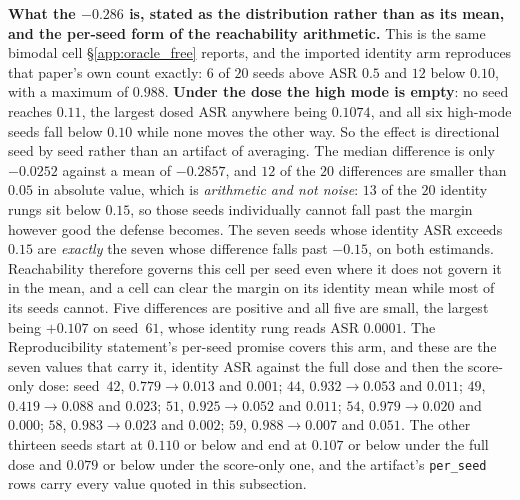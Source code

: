 \documentclass{article}
\begin{document}
\textbf{What the $-0.286$ is, stated as the distribution rather than as its mean, and the per-seed form of the reachability arithmetic.} This is the same bimodal cell §\ref{app:oracle_free} reports, and the imported identity arm reproduces that paper's own count exactly: $6$ of $20$ seeds above ASR $0.5$ and $12$ below $0.10$, with a maximum of $0.988$. \textbf{Under the dose the high mode is empty}: no seed reaches $0.11$, the largest dosed ASR anywhere being $0.1074$, and all six high-mode seeds fall below $0.10$ while none moves the other way. So the effect is directional seed by seed rather than an artifact of averaging. The median difference is only $-0.0252$ against a mean of $-0.2857$, and $12$ of the $20$ differences are smaller than $0.05$ in absolute value, which is \emph{arithmetic and not noise}: $13$ of the $20$ identity rungs sit below $0.15$, so those seeds individually cannot fall past the margin however good the defense becomes. The seven seeds whose identity ASR exceeds $0.15$ are \emph{exactly} the seven whose difference falls past $-0.15$, on both estimands. Reachability therefore governs this cell per seed even where it does not govern it in the mean, and a cell can clear the margin on its identity mean while most of its seeds cannot. Five differences are positive and all five are small, the largest being $+0.107$ on seed~$61$, whose identity rung reads ASR $0.0001$. The Reproducibility statement's per-seed promise covers this arm, and these are the seven values that carry it, identity ASR against the full dose and then the score-only dose: seed~$42$, $0.779 \to 0.013$ and $0.001$; $44$, $0.932 \to 0.053$ and $0.011$; $49$, $0.419 \to 0.088$ and $0.023$; $51$, $0.925 \to 0.052$ and $0.011$; $54$, $0.979 \to 0.020$ and $0.000$; $58$, $0.983 \to 0.023$ and $0.002$; $59$, $0.988 \to 0.007$ and $0.051$. The other thirteen seeds start at $0.110$ or below and end at $0.107$ or below under the full dose and $0.079$ or below under the score-only one, and the artifact's \texttt{per\_seed} rows carry every value quoted in this subsection.
\end{document}
